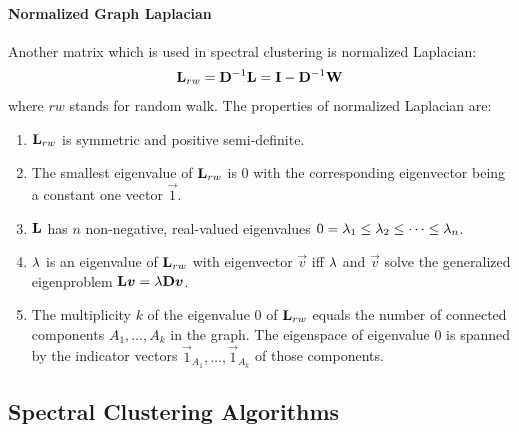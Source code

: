 \paragraph{Normalized Graph Laplacian}

Another matrix which is used in spectral clustering is normalized Laplacian:
\begin{align*}
\mathbf{L}_{rw}=\mathbf{D}^{-1}\mathbf{L}=\mathbf{I}-\mathbf{D}^{-1}\mathbf{W}
\end{align*}
where $rw$ stands for random walk. The properties of normalized Laplacian are:
\begin{enumerate}
	\item $\mathbf{L}_{rw}$ is symmetric and positive semi-definite.
	\item The smallest eigenvalue of $\mathbf{L}_{rw}$ is 0 with the corresponding eigenvector being a constant one vector $\vec{1}$.
	\item $\mathbf{L}$ has $n$ non-negative, real-valued eigenvalues $0=\lambda_1\leq\lambda_2\leq\cdots\leq\lambda_n$.
	\item $\lambda$ is an eigenvalue of $\mathbf{L}_{rw}$ with eigenvector $\vec{v}$ iff $\lambda$ and $\vec{v}$ solve the generalized eigenproblem $\mathbf{L}\boldsymbol{v}=\lambda\mathbf{D}\boldsymbol{v}$.
	\item The multiplicity $k$ of the eigenvalue 0 of $\mathbf{L}_{rw}$ equals the number of connected components $A_1,\dotsc,A_k$ in the graph. The eigenspace of eigenvalue 0 is spanned by the indicator vectors $\vec{1}_{A_1},\dotsc,\vec{1}_{A_k}$ of those components.
\end{enumerate}

\subsection{Spectral Clustering Algorithms}

